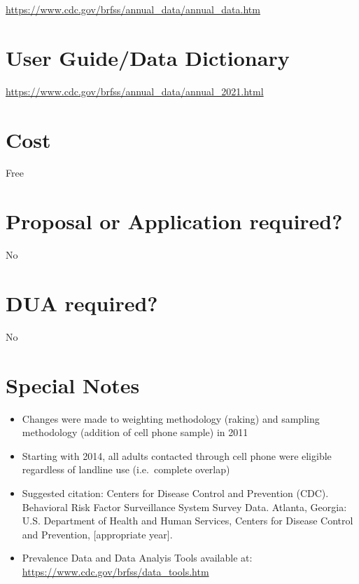 \documentclass[
]{book}
\providecommand{\tightlist}{%
  \setlength{\itemsep}{0pt}\setlength{\parskip}{0pt}}
\begin{document}
\url{https://www.cdc.gov/brfss/annual_data/annual_data.htm}

\hypertarget{user-guidedata-dictionary-12}{%
\section{User Guide/Data Dictionary}\label{user-guidedata-dictionary-12}}

\url{https://www.cdc.gov/brfss/annual_data/annual_2021.html}

\hypertarget{cost-12}{%
\section{Cost}\label{cost-12}}

Free

\hypertarget{proposal-or-application-required-12}{%
\section{Proposal or Application required?}\label{proposal-or-application-required-12}}

No

\hypertarget{dua-required-12}{%
\section{DUA required?}\label{dua-required-12}}

No

\hypertarget{special-notes-12}{%
\section{Special Notes}\label{special-notes-12}}

\begin{itemize}
\tightlist
\item
  Changes were made to weighting methodology (raking) and sampling methodology (addition of cell phone sample) in 2011
\item
  Starting with 2014, all adults contacted through cell phone were eligible regardless of landline use (i.e.~complete overlap)
\item
  Suggested citation: Centers for Disease Control and Prevention (CDC). Behavioral Risk Factor Surveillance System Survey Data. Atlanta, Georgia: U.S. Department of Health and Human Services, Centers for Disease Control and Prevention, {[}appropriate year{]}.
\item
  Prevalence Data and Data Analyis Tools available at: \url{https://www.cdc.gov/brfss/data_tools.htm}
\end{itemize}
\end{document}
